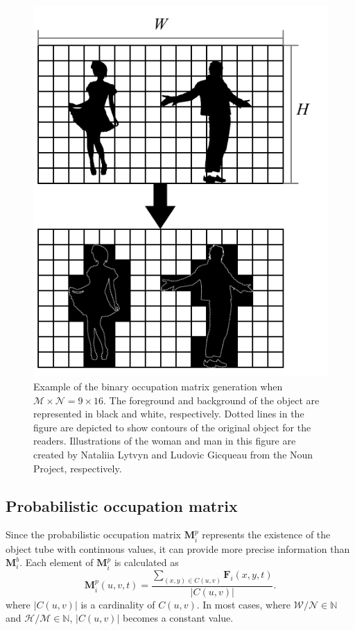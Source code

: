 \documentclass[11pt]{hyu_thesis}
\begin{document}
\begin{figure}
	\begin{center}
		\includegraphics[width=0.7\linewidth]{bin-occ.pdf}
	\end{center}
	\caption{Example of the binary occupation matrix generation when $\mathcal{M}\times\mathcal{N}=9\times16$. The foreground and background of the object are represented in black and white, respectively. Dotted lines in the figure are depicted to show contours of the original object for the readers. Illustrations of the woman and man in this figure are created by Nataliia Lytvyn and Ludovic Gicqueau from the Noun Project, respectively.}
	\label{fig:bin_occ}
\end{figure}

\subsection{Probabilistic occupation matrix}
\label{sec:proposed:occ:prob}
Since the probabilistic occupation matrix $\textbf{M}_i^p$ represents the existence of the object tube with continuous values, it can provide more precise information than $\textbf{M}_i^b$. Each element of $\textbf{M}_i^p$ is calculated as
\begin{equation}
\label{eq:prob_occ}
\textbf{M}_i^p(u,v,t)= \frac{\sum_{(x,y) \in C(u,v)}\textbf{F}_i(x,y,t)}{|C(u,v)|}.
\end{equation}
where $|C(u,v)|$ is a cardinality of $C(u,v)$. In most cases, where $\mathcal{W}/\mathcal{N} \in \mathbb{N}$ and $\mathcal{H}/\mathcal{M} \in \mathbb{N}$, $|C(u,v)|$ becomes a constant value.
\end{document}
